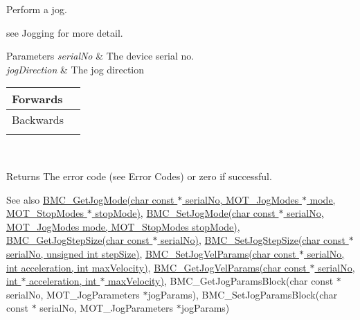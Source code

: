 Perform a jog. 

see Jogging for more detail.


\begin{DoxyParams}{Parameters}
{\em serial\+No} & The device serial no. \\
\hline
{\em jog\+Direction} & The jog direction \begin{tabularx}{\linewidth}{|*{2}{>{\raggedright\arraybackslash}X|}}\hline
Forwards&1 \\\cline{1-2}
Backwards&2 \\\cline{1-2}
\end{tabularx}
\\
\hline
\end{DoxyParams}
\begin{DoxyReturn}{Returns}
The error code (see Error Codes) or zero if successful. 
\end{DoxyReturn}
\begin{DoxySeeAlso}{See also}
\hyperlink{group___t_cube_brushless_motor_gafc92fe606b9cd874d7f28d7791e8a06e}{B\+M\+C\+\_\+\+Get\+Jog\+Mode(char const $\ast$ serial\+No, M\+O\+T\+\_\+\+Jog\+Modes $\ast$ mode, M\+O\+T\+\_\+\+Stop\+Modes $\ast$ stop\+Mode)}, \hyperlink{group___t_cube_brushless_motor_ga5cc6ed2932a1761531546d41a9240136}{B\+M\+C\+\_\+\+Set\+Jog\+Mode(char const $\ast$ serial\+No, M\+O\+T\+\_\+\+Jog\+Modes mode, M\+O\+T\+\_\+\+Stop\+Modes stop\+Mode)}, \hyperlink{group___t_cube_brushless_motor_ga2a2db2c5c7f24bbff73f17af4e10bdd1}{B\+M\+C\+\_\+\+Get\+Jog\+Step\+Size(char const $\ast$ serial\+No)}, \hyperlink{group___t_cube_brushless_motor_gaeff03c620c9c2a0719c58dc9d97ed8c3}{B\+M\+C\+\_\+\+Set\+Jog\+Step\+Size(char const $\ast$ serial\+No, unsigned int step\+Size)}, \hyperlink{group___t_cube_brushless_motor_ga5344f441c200c330ef267401054c307e}{B\+M\+C\+\_\+\+Set\+Jog\+Vel\+Params(char const $\ast$ serial\+No, int acceleration, int max\+Velocity)}, \hyperlink{group___t_cube_brushless_motor_ga096d9f530ba9e298f7c687a891b6182f}{B\+M\+C\+\_\+\+Get\+Jog\+Vel\+Params(char const $\ast$ serial\+No, int $\ast$ acceleration, int $\ast$ max\+Velocity)}, B\+M\+C\+\_\+\+Get\+Jog\+Params\+Block(char const $\ast$ serial\+No, M\+O\+T\+\_\+\+Jog\+Parameters $\ast$jog\+Params), B\+M\+C\+\_\+\+Set\+Jog\+Params\+Block(char const $\ast$ serial\+No, M\+O\+T\+\_\+\+Jog\+Parameters $\ast$jog\+Params)


\end{DoxySeeAlso}

\begin{DoxyCodeInclude}
\end{DoxyCodeInclude}
